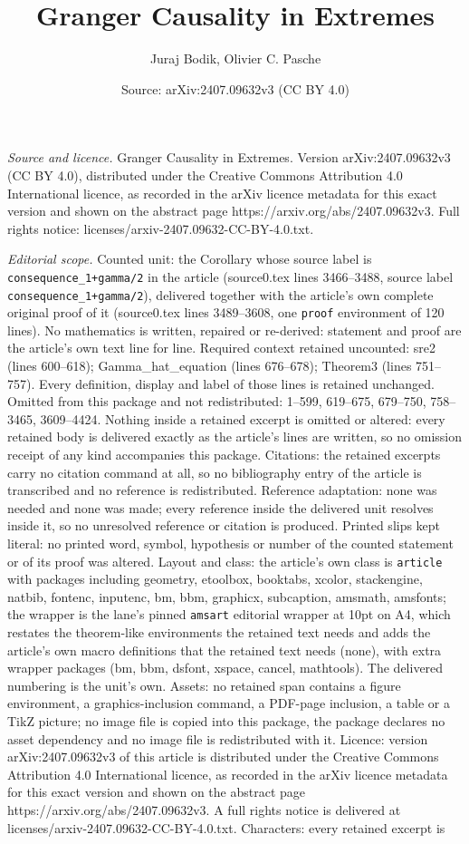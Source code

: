 \documentclass[10pt,a4paper]{amsart}
\title[Granger Causality in Extremes]{Granger Causality in Extremes}
\author{Juraj Bodik, Olivier C. Pasche}
\date{Source: arXiv:2407.09632v3 (CC BY 4.0)}
\begin{document}
\maketitle

\noindent\emph{Source and licence.} Granger Causality in Extremes. Version arXiv:2407.09632v3 (CC BY 4.0), distributed under the Creative Commons Attribution 4.0 International licence, as recorded in the arXiv licence metadata for this exact version and shown on the abstract page https://arxiv.org/abs/2407.09632v3. Full rights notice: licenses/arxiv-2407.09632-CC-BY-4.0.txt.\par\smallskip

\noindent\textit{Editorial scope.} Counted unit: the Corollary whose source label is \texttt{consequence\_1+gamma/2} in the article (source0.tex lines 3466--3488, source label \texttt{consequence\_1+gamma/2}), delivered together with the article's own complete original proof of it (source0.tex lines 3489--3608, one \texttt{proof} environment of 120 lines). No mathematics is written, repaired or re-derived: statement and proof are the article's own text line for line. Required context retained uncounted: sre2 (lines 600--618); Gamma\_hat\_equation (lines 676--678); Theorem3 (lines 751--757). Every definition, display and label of those lines is retained unchanged. Omitted from this package and not redistributed: 1--599, 619--675, 679--750, 758--3465, 3609--4424. Nothing inside a retained excerpt is omitted or altered: every retained body is delivered exactly as the article's lines are written, so no omission receipt of any kind accompanies this package. Citations: the retained excerpts carry no citation command at all, so no bibliography entry of the article is transcribed and no reference is redistributed. Reference adaptation: none was needed and none was made; every reference inside the delivered unit resolves inside it, so no unresolved reference or citation is produced. Printed slips kept literal: no printed word, symbol, hypothesis or number of the counted statement or of its proof was altered. Layout and class: the article's own class is \texttt{article} with packages including geometry, etoolbox, booktabs, xcolor, stackengine, natbib, fontenc, inputenc, bm, bbm, graphicx, subcaption, amsmath, amsfonts; the wrapper is the lane's pinned \texttt{amsart} editorial wrapper at 10pt on A4, which restates the theorem-like environments the retained text needs and adds the article's own macro definitions that the retained text needs (none), with extra wrapper packages (bm, bbm, dsfont, xspace, cancel, mathtools). The delivered numbering is the unit's own. Assets: no retained span contains a figure environment, a graphics-inclusion command, a PDF-page inclusion, a table or a TikZ picture; no image file is copied into this package, the package declares no asset dependency and no image file is redistributed with it. Licence: version arXiv:2407.09632v3 of this article is distributed under the Creative Commons Attribution 4.0 International licence, as recorded in the arXiv licence metadata for this exact version and shown on the abstract page https://arxiv.org/abs/2407.09632v3. A full rights notice is delivered at licenses/arxiv-2407.09632-CC-BY-4.0.txt. Characters: every retained excerpt is 
\end{document}
